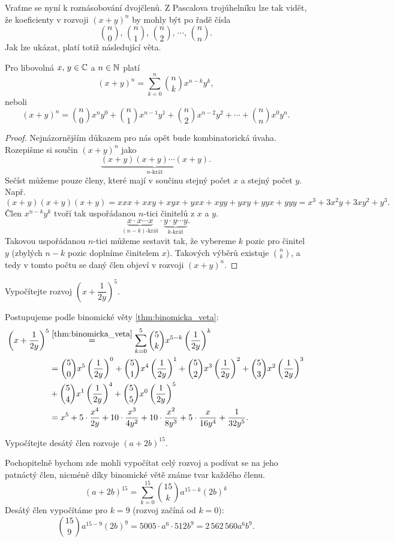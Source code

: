 Vraťme se nyní k roznásobování dvojčlenů. Z Pascalova trojúhelníku lze tak vidět, že koeficienty v rozvoji $(x+y)^n$ by mohly být po řadě čísla
\[\binom{n}{0},\,\binom{n}{1},\,\binom{n}{2},\,\cdots,\,\binom{n}{n}.\]
Jak lze ukázat, platí totiž následující věta.
\begin{theorem}[Binomická]\label{thm:binomicka_veta}
    Pro libovolná $x,\,y\in\mathbb{C}$ a $n\in\mathbb{N}$ platí
    \[(x+y)^n=\sum_{k=0}^{n}\binom{n}{k}x^{n-k}y^k,\]
    neboli
    \[(x+y)^n=\binom{n}{0}x^ny^0+\binom{n}{1}x^{n-1}y^1+\binom{n}{2}x^{n-2}y^2+\cdots+\binom{n}{n}x^0y^n.\]
\end{theorem}
\begin{proof}
    Nejnázornějším důkazem pro nás opět bude kombinatorická úvaha. Rozepišme si součin $(x+y)^n$ jako
    \[\underbrace{(x+y)(x+y)\cdots(x+y)}_{n\text{-krát}}.\]
    Sečíst můžeme pouze členy, které mají v součinu stejný počet $x$ a stejný počet $y$. Např.
    \[(x+y)(x+y)(x+y)=xxx+xxy+xyx+yxx+xyy+yxy+yyx+yyy=x^3+3x^2y+3xy^2+y^3.\]
    Člen $x^{n-k}y^k$ tvoří tak uspořádanou $n$-tici činitelů z $x$ a $y$.
    \[\underbrace{x\cdot x\cdots x}_{(n-k)\text{-krát}} \cdot \underbrace{y\cdot y\cdots y}_{k\text{-krát}}.\]
    Takovou uspořádanou $n$-tici můžeme sestavit tak, že vybereme $k$ pozic pro činitel $y$ (zbylých $n-k$ pozic doplníme činitelem $x$). Takových výběrů existuje $\binom{n}{k}$, a tedy v tomto počtu se daný člen objeví v rozvoji $(x+y)^n$.
\end{proof}
\begin{task}
    Vypočítejte rozvoj $\displaystyle \left(x+\dfrac{1}{2y}\right)^5$.
\end{task}
\begin{solution}
    Postupujeme podle binomické věty \ref{thm:binomicka_veta}:
    \begin{align*}
        \left(x+\dfrac{1}{2y}\right)^5 &\stackrel{\ref{thm:binomicka_veta}}{=}\sum_{k=0}^{5}\binom{5}{k}x^{5-k}\left(\dfrac{1}{2y}\right)^k \\
        &=\binom{5}{0}x^5\left(\dfrac{1}{2y}\right)^0+\binom{5}{1}x^4\left(\dfrac{1}{2y}\right)^1+\binom{5}{2}x^3\left(\dfrac{1}{2y}\right)^2+\binom{5}{3}x^2\left(\dfrac{1}{2y}\right)^3\\ &+\binom{5}{4}x^1\left(\dfrac{1}{2y}\right)^4+\binom{5}{5}x^0\left(\dfrac{1}{2y}\right)^5\\
        &=x^5+5\cdot\dfrac{x^4}{2y}+10\cdot\dfrac{x^3}{4y^2}+10\cdot\dfrac{x^2}{8y^3}+5\cdot\dfrac{x}{16y^4}+\dfrac{1}{32y^5}.
    \end{align*}
\end{solution}
\begin{task}
    Vypočítejte desátý člen rozvoje $(a+2b)^{15}$.
\end{task}
\begin{solution}
    Pochopitelně bychom zde mohli vypočítat celý rozvoj a podívat se na jeho patnáctý člen, nicméně díky binomické větě známe tvar každého členu.
    \[(a+2b)^15=\sum_{k=0}^{15}\binom{15}{k}a^{15-k}(2b)^k\]
    Desátý člen vypočítáme pro $k=9$ (rozvoj začíná od $k=0$):
    \[\binom{15}{9}a^{15-9}(2b)^{9}=5005\cdot a^6\cdot 512b^9=2\,562\,560a^6b^9.\]
\end{solution}

